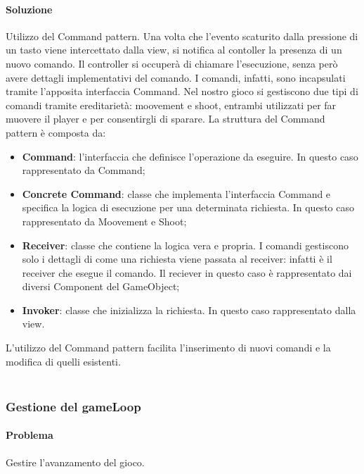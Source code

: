 \documentclass[a4paper,12pt]{report}
\begin{document}
\paragraph*{Soluzione} Utilizzo del Command pattern. Una volta che l’evento scaturito dalla pressione di un tasto viene intercettato dalla view, si notifica al contoller la presenza di un nuovo comando. Il controller si occuperà di chiamare l’esecuzione, senza però avere dettagli implementativi del comando. I comandi, infatti, sono incapsulati tramite l’apposita interfaccia Command. Nel nostro gioco si gestiscono due tipi di comandi tramite ereditarietà: moovement e shoot, entrambi utilizzati per far muovere il player e per consentirgli di sparare.
La struttura del Command pattern è composta da:
\begin{itemize}
	\item \textbf{Command}:
	l'interfaccia che definisce l’operazione da eseguire. In questo caso rappresentato da Command;
	\item \textbf{Concrete Command}:
	classe che implementa l’interfaccia Command e specifica la logica di esecuzione per una determinata richiesta. In questo caso rappresentato da Moovement e Shoot;
	\item \textbf{Receiver}:
	classe che contiene la logica vera e propria. I comandi gestiscono solo i dettagli di come una richiesta viene passata al receiver: infatti è il receiver che esegue il comando. Il reciever in questo caso è rappresentato dai diversi Component del GameObject;
	\item \textbf{Invoker}:
	classe che inizializza la richiesta. In questo caso rappresentato dalla view.
\end{itemize}
L’utilizzo del Command pattern facilita l’inserimento di nuovi comandi e la modifica di quelli esistenti.
%
\\ \\
\subsubsection*{Gestione del gameLoop}
%
\paragraph*{Problema} Gestire l'avanzamento del gioco.
%
\end{document}
